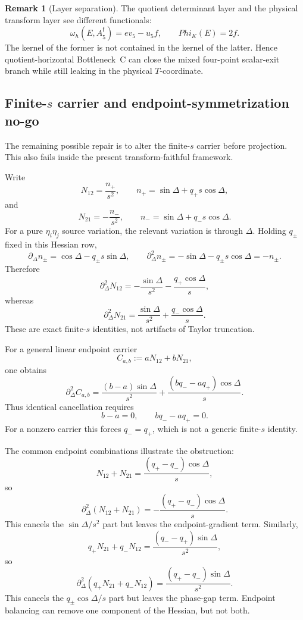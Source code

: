 \documentclass[11pt,a4paper]{amsart}
\def\Phi{Phi}%
\theoremstyle{plain}
\theoremstyle{definition}
\newtheorem{remark}[theorem]{Remark}
\begin{document}
\begin{remark}[Layer separation]
\label{rem:quotient-layer-separation-bc}
The quotient determinant layer and the physical transform layer see different
functionals:
\[
\omega_h(E,A_5^{\mathfrak f})=ev_5-u_5f,
\qquad
\Phi_K(E)=2f.
\]
The kernel of the former is not contained in the kernel of the latter.  Hence
quotient-horizontal Bottleneck~C can close the mixed four-point scalar-exit
branch while still leaking in the physical \(T\)-coordinate.
\end{remark}

\subsection{Finite-\(s\) carrier and endpoint-symmetrization no-go}
\label{subsec:finite-s-carrier-endpoint-symmetrization-no-go}

The remaining possible repair is to alter the finite-\(s\) carrier before
projection.  This also fails inside the present transform-faithful framework.

Write
\[
N_{12}
=
\frac{n_+}{s^2},
\qquad
n_+
=
\sin\Delta+q_+s\cos\Delta,
\]
and
\[
N_{21}
=
-\frac{n_-}{s^2},
\qquad
n_-
=
\sin\Delta+q_-s\cos\Delta.
\]
For a pure \(\eta_i\eta_j\) source variation, the relevant variation is through
\(\Delta\).  Holding \(q_\pm\) fixed in this Hessian row,
\[
\partial_\Delta n_\pm
=
\cos\Delta-q_\pm s\sin\Delta,
\qquad
\partial_\Delta^2 n_\pm
=
-\sin\Delta-q_\pm s\cos\Delta
=
-n_\pm.
\]
Therefore
\[
\partial_\Delta^2N_{12}
=
-\frac{\sin\Delta}{s^2}
-\frac{q_+\cos\Delta}{s},
\]
whereas
\[
\partial_\Delta^2N_{21}
=
\frac{\sin\Delta}{s^2}
+
\frac{q_-\cos\Delta}{s}.
\]
These are exact finite-\(s\) identities, not artifacts of Taylor truncation.

For a general linear endpoint carrier
\[
C_{a,b}:=aN_{12}+bN_{21},
\]
one obtains
\[
\partial_\Delta^2 C_{a,b}
=
\frac{(b-a)\sin\Delta}{s^2}
+
\frac{(bq_- - aq_+)\cos\Delta}{s}.
\]
Thus identical cancellation requires
\[
b-a=0,
\qquad
bq_- - aq_+=0.
\]
For a nonzero carrier this forces \(q_-=q_+\), which is not a generic
finite-\(s\) identity.

The common endpoint combinations illustrate the obstruction:
\[
N_{12}+N_{21}
=
\frac{(q_+-q_-)\cos\Delta}{s},
\]
so
\[
\partial_\Delta^2(N_{12}+N_{21})
=
-\frac{(q_+-q_-)\cos\Delta}{s}.
\]
This cancels the \(\sin\Delta/s^2\) part but leaves the endpoint-gradient
term.  Similarly,
\[
q_+N_{21}+q_-N_{12}
=
\frac{(q_- - q_+)\sin\Delta}{s^2},
\]
so
\[
\partial_\Delta^2(q_+N_{21}+q_-N_{12})
=
\frac{(q_+ - q_-)\sin\Delta}{s^2}.
\]
This cancels the \(q_\pm\cos\Delta/s\) part but leaves the phase-gap term.
Endpoint balancing can remove one component of the Hessian, but not both.
\end{document}
